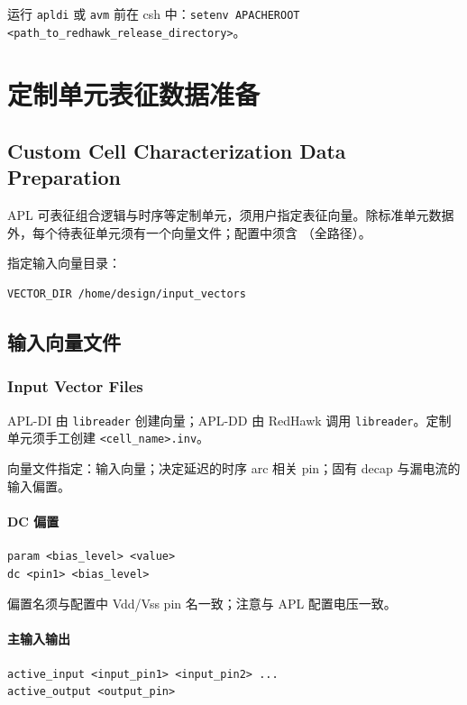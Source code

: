 运行 \texttt{apldi} 或 \texttt{avm} 前在 csh 中：\texttt{setenv APACHEROOT <path\_to\_redhawk\_release\_directory>}。

\section{定制单元表征数据准备}
\subsection*{Custom Cell Characterization Data Preparation}

APL 可表征组合逻辑与时序等定制单元，须用户指定表征向量。除标准单元数据外，每个待表征单元须有一个向量文件；配置中须含 （全路径）。

 指定输入向量目录：
\begin{lstlisting}
VECTOR_DIR /home/design/input_vectors
\end{lstlisting}

\subsection{输入向量文件}
\subsubsection*{Input Vector Files}

APL-DI 由 \texttt{libreader} 创建向量；APL-DD 由 RedHawk 调用 \texttt{libreader}。定制单元须手工创建 \texttt{<cell_name>.inv}。

向量文件指定：输入向量；决定延迟的时序 arc 相关 pin；固有 decap 与漏电流的输入偏置。

\paragraph{DC 偏置}
\begin{lstlisting}
param <bias_level> <value>
dc <pin1> <bias_level>
\end{lstlisting}
偏置名须与配置中 Vdd/Vss pin 名一致；注意与 APL 配置电压一致。

\paragraph{主输入输出}
\begin{lstlisting}
active_input <input_pin1> <input_pin2> ...
active_output <output_pin>
\end{lstlisting}


